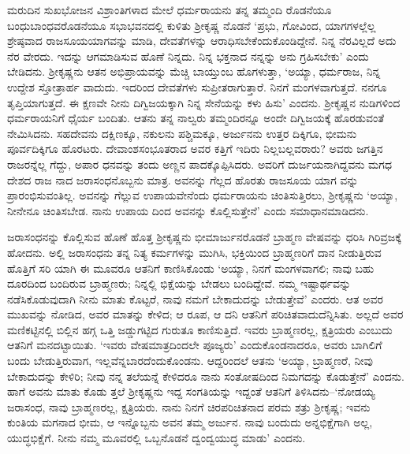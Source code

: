 ಮರುದಿನ ಸುಖಭೋಜನ ವಿಶ್ರಾಂತಿಗಳಾದ ಮೇಲೆ ಧರ್ಮರಾಯನು ತನ್ನ ತಮ್ಮಂದಿ ರೊಡನೆಯೂ ಬಂಧುಬಾಂಧವರೊಡನೆಯೂ ಸಭಾಭವನದಲ್ಲಿ ಕುಳಿತು ಶ್ರೀಕೃಷ್ಣ ನೊಡನೆ ‘ಪ್ರಭು, ಗೋವಿಂದ, ಯಾಗಗಳಲ್ಲೆಲ್ಲ ಶ್ರೇಷ್ಠವಾದ ರಾಜಸೂಯಯಾಗವನ್ನು ಮಾಡಿ, ದೇವತೆಗಳನ್ನು ಆರಾಧಿಸಬೇಕೆಂದುಕೊಂಡಿದ್ದೇನೆ. ನಿನ್ನ ನೆರವಿಲ್ಲದೆ ಅದು ನೆರ ವೇರದು. ಇದನ್ನು ಆಗಮಾಡಿಸುವ ಹೊಣೆ ನಿನ್ನದು. ನಿನ್ನ ಭಕ್ತನಾದ ನನ್ನನ್ನು ಅನು ಗ್ರಹಿಸಬೇಕು’ ಎಂದು ಬೇಡಿದನು. ಶ್ರೀಕೃಷ್ಣನು ಆತನ ಅಭಿಪ್ರಾಯವನ್ನು ಮೆಚ್ಚಿ ಬಾಯ್ತುಂಬ ಹೊಗಳುತ್ತಾ, ‘ಅಯ್ಯಾ, ಧರ್ಮರಾಜ, ನಿನ್ನ ಉದ್ದೇಶ ಸ್ತೋತ್ರಾರ್ಹ ವಾದುದು. ಇದರಿಂದ ದೇವತೆಗಳು ಸುಪ್ರೀತರಾಗುತ್ತಾರೆ. ನಿನಗೆ ಮಂಗಳವಾಗುತ್ತದೆ. ನನಗೂ ತೃಪ್ತಿಯಾಗುತ್ತದೆ. ಈ ಕ್ಷಣವೇ ನೀನು ದಿಗ್ವಿಜಯಕ್ಕಾಗಿ ನಿನ್ನ ಸೇನೆಯನ್ನು ಕಳು ಹಿಸು’ ಎಂದನು. ಶ್ರೀಕೃಷ್ಣನ ನುಡಿಗಳಿಂದ ಧರ್ಮರಾಯನಿಗೆ ಧೈರ್ಯ ಬಂದಿತು. ಆತನು ತನ್ನ ನಾಲ್ವರು ತಮ್ಮಂದಿರನ್ನೂ ಅಂದೇ ದಿಗ್ವಿಜಯಕ್ಕೆ ಹೊರಡುವಂತೆ ನೇಮಿಸಿದನು. ಸಹದೇವನು ದಕ್ಷಿಣಕ್ಕೂ, ನಕುಲನು ಪಶ್ಚಿಮಕ್ಕೂ, ಅರ್ಜುನನು ಉತ್ತರ ದಿಕ್ಕಿಗೂ, ಭೀಮನು ಪೂರ್ವದಿಕ್ಕಿಗೂ ಹೊರಟರು. ದೇವಾಂಶಸಂಭೂತರಾದ ಅವರ ಕತ್ತಿಗೆ ಇದಿರು ನಿಲ್ಲಬಲ್ಲವರಾರು? ಅವರು ಜಗತ್ತಿನ ರಾಜರನ್ನೆಲ್ಲ ಗೆದ್ದು, ಅಪಾರ ಧನವನ್ನು ತಂದು ಅಣ್ಣನ ಪಾದಕ್ಕೊಪ್ಪಿಸಿದರು. ಅವರಿಗೆ ದುರ್ಜಯನಾಗಿದ್ದವನು ಮಗಧ ದೇಶದ ರಾಜ ನಾದ ಜರಾಸಂಧನೊಬ್ಬನು ಮಾತ್ರ. ಅವನನ್ನು ಗೆಲ್ಲದ ಹೊರತು ರಾಜಸೂಯ ಯಾಗ ವನ್ನು ಪ್ರಾರಂಭಿಸುವಂತಿಲ್ಲ. ಅವನನ್ನು ಗೆಲ್ಲುವ ಉಪಾಯವೇನೆಂದು ಧರ್ಮರಾಯನು ಚಿಂತಿಸುತ್ತಿರಲು, ಶ್ರೀಕೃಷ್ಣನು ‘ಅಯ್ಯಾ, ನೀನೇನೂ ಚಿಂತಿಸಬೇಡ. ನಾನು ಉಪಾಯ ದಿಂದ ಅವನನ್ನು ಕೊಲ್ಲಿಸುತ್ತೇನೆ’ ಎಂದು ಸಮಾಧಾನಮಾಡಿದನು.

ಜರಾಸಂಧನನ್ನು ಕೊಲ್ಲಿಸುವ ಹೊಣೆ ಹೊತ್ತ ಶ್ರೀಕೃಷ್ಣನು ಭೀಮಾರ್ಜುನರೊಡನೆ ಬ್ರಾಹ್ಮಣ ವೇಷವನ್ನು ಧರಿಸಿ ಗಿರಿವ್ರಜಕ್ಕೆ ಹೋದನು. ಅಲ್ಲಿ ಜರಾಸಂಧನು ತನ್ನ ನಿತ್ಯ ಕರ್ಮಗಳನ್ನು ಮುಗಿಸಿ, ಭಕ್ತಿಯಿಂದ ಬ್ರಾಹ್ಮಣರಿಗೆ ದಾನ ನೀಡುತ್ತಿರುವ ಹೊತ್ತಿಗೆ ಸರಿ ಯಾಗಿ ಈ ಮೂವರೂ ಆತನಿಗೆ ಕಾಣಿಸಿಕೊಂಡು ‘ಅಯ್ಯಾ, ನಿನಗೆ ಮಂಗಳವಾಗಲಿ; ನಾವು ಬಹು ದೂರದಿಂದ ಬಂದಿರುವ ಬ್ರಾಹ್ಮಣರು; ನಿನ್ನಲ್ಲಿ ಭಿಕ್ಷೆಯನ್ನು ಬೇಡಲು ಬಂದಿದ್ದೇವೆ. ನಮ್ಮ ಇಷ್ಟಾರ್ಥವನ್ನು ನಡೆಸಿಕೊಡುವುದಾಗಿ ನೀನು ಮಾತು ಕೊಟ್ಟರೆ, ನಾವು ನಮಗೆ ಬೇಕಾದುದನ್ನು ಬೇಡುತ್ತೇವೆ’ ಎಂದರು. ಆತ ಅವರ ಮುಖವನ್ನು ನೋಡಿದ, ಅವರ ಮಾತನ್ನು ಕೇಳಿದ; ಆ ರೂಪ, ಆ ದನಿ ಆತನಿಗೆ ಪರಿಚಿತವಾದುದೆನ್ನಿಸಿತು. ಅಲ್ಲದೆ ಅವರ ಮಣಿಕಟ್ಟಿನಲ್ಲಿ ಬಿಲ್ಲಿನ ಹಗ್ಗ ಒತ್ತಿ ಜಡ್ಡುಗಟ್ಟಿದ ಗುರುತೂ ಕಾಣಿಸುತ್ತಿದೆ. ಇವರು ಬ್ರಾಹ್ಮಣರಲ್ಲ, ಕ್ಷತ್ರಿಯರು ಎಂಬುದು ಆತನಿಗೆ ಮನದಟ್ಟಾಯಿತು. ‘ಇವರು ವೇಷಮಾತ್ರದಿಂದಲೇ ಪೂಜ್ಯರು’ ಎಂದುಕೊಂಡನಾದರೂ, ಅವರು ಬಾಗಿಲಿಗೆ ಬಂದು ಬೇಡುತ್ತಿರುವಾಗ, ಇಲ್ಲವೆನ್ನಬಾರದೆಂದುಕೊಂಡನು. ಆದ್ದರಿಂದಲೆ ಆತನು ‘ಅಯ್ಯಾ, ಬ್ರಾಹ್ಮಣರೆ, ನೀವು ಬೇಕಾದುದನ್ನು ಕೇಳಿರಿ; ನೀವು ನನ್ನ ತಲೆಯನ್ನೆ ಕೇಳಿದರೂ ನಾನು ಸಂತೋಷದಿಂದ ನಿಮಗದನ್ನು ಕೊಡುತ್ತೇನೆ’ ಎಂದನು. ಹಾಗೆ ಅವನು ಮಾತು ಕೊಡು ತ್ತಲೆ ಶ್ರೀಕೃಷ್ಣನು ಇದ್ದ ಸಂಗತಿಯನ್ನು ಇದ್ದಂತೆ ಆತನಿಗೆ ತಿಳಿಸಿದನು–‘ನೋಡಯ್ಯ ಜರಾಸಂಧ, ನಾವು ಬ್ರಾಹ್ಮಣರಲ್ಲ, ಕ್ಷತ್ರಿಯರು. ನಾನು ನಿನಗೆ ಚಿರಪರಿಚಿತನಾದ ಪರಮ ಶತ್ರು ಶ್ರೀಕೃಷ್ಣ; ಇವನು ಕುಂತಿಯ ಮಗನಾದ ಭೀಮ, ಆ ಇನ್ನೊಬ್ಬನು ಅವನ ತಮ್ಮ ಅರ್ಜುನ. ನಾವು ಬಂದುದು ಅನ್ನಭಿಕ್ಷೆಗಾಗಿ ಅಲ್ಲ, ಯುದ್ಧಭಿಕ್ಷೆಗೆ. ನೀನು ನಮ್ಮ ಮೂವರಲ್ಲಿ ಒಬ್ಬನೊಡನೆ ದ್ವಂದ್ವಯುದ್ಧ ಮಾಡು’ ಎಂದನು.

